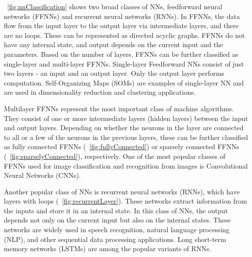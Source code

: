 \documentclass[a4paper,10pt]{article}
\begin{document}
\figurename{~\ref{fig:nnClassification}} shows two broad classes of NNs, feedforward neural networks (FFNNs) and recurrent neural networks (RNNs). In FFNNs, the data flow from the input layer to the output layer via intermediate layers, and there are no loops. These can be represented as directed acyclic graphs. FFNNs do not have any internal state, and output depends on the current input and the parameters. Based on the number of layers, FFNNs can be further classified as single-layer and multi-layer FFNNs. Single-layer Feedforward NNs consist of just two layers - an input and an output layer. Only the output layer performs computation. Self-Organizing Maps (SOMs) are examples of single-layer NN and are used in dimensionality reduction and clustering applications. 

Multilayer FFNNs represent the most important class of machine algorithms. They consist of one or more intermediate layers (hidden layers) between the input and output layers. Depending on whether the neurons in the layer are connected to all or a few of the neurons in the previous layers, these can be further classified as fully connected FFNNs (\figurename{~\ref{fig:fullyConnected}}) or sparsely connected FFNNs (\figurename{~\ref{fig:sparselyConnected}}), respectively. One of the most popular classes of FFNNs used for image classification and recognition from images is Convolutional Neural Networks (CNNs).

Another popular class of NNs is recurrent neural networks (RNNs), which have layers with loops (\figurename{~\ref{fig:recurrentLayer}}). These networks extract information from the inputs and store it in an internal state. In this class of NNs, the output depends not only on the current input but also on the internal states. These networks are widely used in speech recognition, natural language processing (NLP), and other sequential data processing applications. Long short-term memory networks (LSTMs) are among the popular variants of RNNs.
\end{document}
